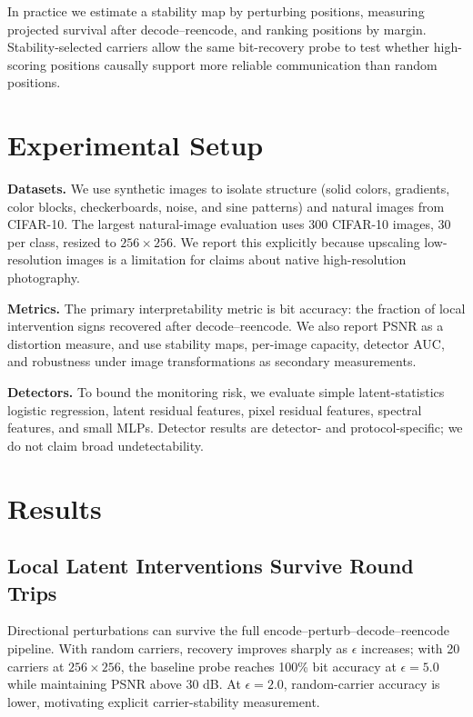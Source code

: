 \documentclass{article}
\begin{document}
In practice we estimate a stability map by perturbing positions, measuring projected survival after decode--reencode, and ranking positions by margin. Stability-selected carriers allow the same bit-recovery probe to test whether high-scoring positions causally support more reliable communication than random positions.

\section{Experimental Setup}

\textbf{Datasets.}
We use synthetic images to isolate structure (solid colors, gradients, color blocks, checkerboards, noise, and sine patterns) and natural images from CIFAR-10. The largest natural-image evaluation uses 300 CIFAR-10 images, 30 per class, resized to $256\times256$. We report this explicitly because upscaling low-resolution images is a limitation for claims about native high-resolution photography.

\textbf{Metrics.}
The primary interpretability metric is bit accuracy: the fraction of local intervention signs recovered after decode--reencode. We also report PSNR as a distortion measure, and use stability maps, per-image capacity, detector AUC, and robustness under image transformations as secondary measurements.

\textbf{Detectors.}
To bound the monitoring risk, we evaluate simple latent-statistics logistic regression, latent residual features, pixel residual features, spectral features, and small MLPs. Detector results are detector- and protocol-specific; we do not claim broad undetectability.

\section{Results}

\subsection{Local Latent Interventions Survive Round Trips}

Directional perturbations can survive the full encode--perturb--decode--reencode pipeline. With random carriers, recovery improves sharply as $\epsilon$ increases; with 20 carriers at $256\times256$, the baseline probe reaches 100\% bit accuracy at $\epsilon=5.0$ while maintaining PSNR above 30 dB. At $\epsilon=2.0$, random-carrier accuracy is lower, motivating explicit carrier-stability measurement.
\end{document}

